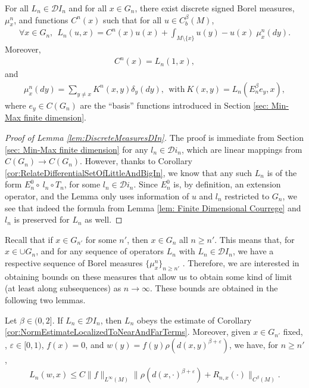 \documentclass[11pt,reqno]{amsart}
\numberwithin{equation}{section}
\theoremstyle{plain}
\def\D{\mathcal D}
\def\ep{\varepsilon}
\def\del{\delta}
\newcommand{\norm}[1]{\lVert#1\rVert}
\begin{document}
\begin{lem}\label{lem:DiscreteMeasuresDIn}
	For all $L_n\in \D I_n$ and for all $x\in G_n$, there exist discrete signed Borel measures, $\mu_x^n$, and functions $C^n(x)$ such that for all $u\in C^\beta_b(M)$,
	\begin{align*}
		\forall x\in G_n,\ \ L_n(u,x) = C^n(x)u(x)
		+\int_{M\setminus\{x\}}u(y)-u(x)\; \mu_x^{n}(dy).
	\end{align*} 
	Moreover,
	\begin{align}\label{eqMMonM:Cn}
		C^n(x) = L_n(1,x),
	\end{align}
	and
	\begin{align*}
		\mu_x^n(dy) = \sum_{y\not=x} K^n(x,y)\del_y(dy),\ \ \text{with}\ 
		K(x,y) = L_n(E_n^\beta e_y,x),
	\end{align*}
	where $e_y \in C(G_n)$ are the ``basis'' functions introduced in Section \ref{sec: Min-Max finite dimension}.
\end{lem}

\begin{proof}[Proof of Lemma \ref{lem:DiscreteMeasuresDIn}]
	The proof is immediate from Section \ref{sec: Min-Max finite dimension} for any $l_n\in \D i_n$, which are linear mappings from $C(G_n)\to C(G_n)$.  However, thanks to Corollary \ref{cor:RelateDifferentialSetOfLittleAndBigIn}, we know that any such $L_n$ is of the form $E_n^0 \circ \ l_n \circ T_n$, for some $l_n\in \D i_n$.  Since $E_n^0$ is, by definition, an extension operator, and the Lemma only uses information of $u$ and $l_n$ restricted to $G_n$, we see that indeed the formula from Lemma \ref{lem: Finite Dimensional Courrege} and $l_n$ is preserved for $L_n$ as well.
\end{proof}

Recall that if $x \in G_{n'}$ for some $n'$, then $x\in G_n$ all $n\geq n'$. This means that, for $x \in \cup G_n$, and for any sequence of operators $L_n$ with $L_n \in \D I_n$, we have a respective sequence of Borel measures $\{ \mu_x^{n}\}_{n\geq n'}$ . Therefore, we are interested in obtaining bounds on these measures that allow us to obtain some kind of limit (at least along subsequences) as $n\to \infty$. These bounds are obtained in the following two lemmas.

\begin{lem}\label{lem:LnObeysBetaTouchingFromAboveBound}
	Let $\beta \in(0,2]$. If $L_n\in \D I_n$, then $L_n$ obeys the estimate of Corollary \ref{cor:NormEstimateLocalizedToNearAndFarTerms}. Moreover, given $x\in G_{n'}$ fixed, , $\ep\in[0,1)$, $f(x)=0$, and $w(y)=f(y)\rho(d(x,y)^{\beta+\ep})$, we have, for $n\geq n'$,
	\begin{align*}
		L_n(w,x)\leq C\norm{f}_{L^\infty(M)}\norm{\rho(d(x,\cdot)^{\beta+\ep})+R_{n,x}(\cdot)}_{C^\beta(M)}.
	\end{align*} 
\end{lem}
\end{document}
